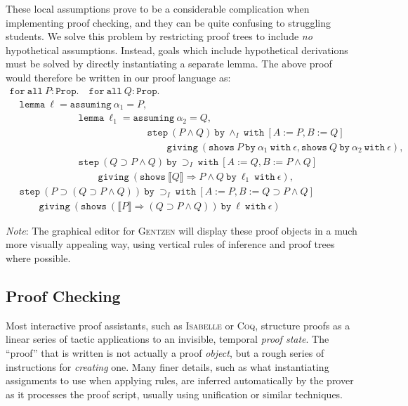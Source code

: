 \documentclass[a4paper]{jfp}
\begin{document}
These local assumptions prove to be a considerable complication when implementing proof checking,
and they can be quite confusing to struggling students. We solve this problem by restricting proof
trees to include \emph{no} hypothetical assumptions. Instead, goals which include hypothetical
derivations must be solved by directly instantiating a separate lemma. The above proof would therefore be written in our
proof language as:
$$
\begin{array}{l}
\mathtt{for\ all}\ P : \mathtt{Prop}.\quad \mathtt{for\ all}\ Q : \mathtt{Prop}.\\
\quad \mathtt{lemma}\ \ell = \mathtt{assuming}\ \alpha_1 = P, \\
\quad \qquad \qquad \qquad \mathtt{lemma}\ \ell_1 = \mathtt{assuming}\ \alpha_2 = Q, \\
\quad \qquad \qquad \qquad \qquad \qquad \qquad \quad \mathtt{step}\ (P \land Q)\ \mathtt{by}\ \land_I\ \mathtt{with}\ [A := P, B := Q ]\ \\ 
\quad \qquad \qquad \qquad \qquad \qquad \qquad \quad \qquad \mathtt{giving}\ (\mathtt{shows}\ P\ \mathtt{by}\ \alpha_1\ \mathtt{with}\ \epsilon, \mathtt{shows}\ Q\ \mathtt{by}\ \alpha_2\ \mathtt{with}\ \epsilon), \\
\quad \qquad \qquad \qquad  \mathtt{step}\ (Q \supset P \land Q)\ \mathtt{by}\ \supset_I\ \mathtt{with}\ [ A := Q, B := P \land Q ]                 \\
\qquad \qquad \qquad \qquad \quad \mathtt{giving}\ (\mathtt{shows}\ \llbracket Q \rrbracket \Rightarrow P \land Q\ \mathtt{by}\ \ell_1\ \mathtt{with}\ \epsilon), \\
\quad  \mathtt{step}\ (P \supset (Q \supset P \land Q))\ \mathtt{by}\ \supset_I\ \mathtt{with}\ [A := P, B := Q \supset P \land Q]\ \\
\quad \qquad \mathtt{giving}\ (\mathtt{shows}\ (\llbracket P \rrbracket \Rightarrow (Q \supset P \land Q))\ \mathtt{by}\ \ell\ \mathtt{with}\ \epsilon)
\end{array}
$$

\emph{Note}: The graphical editor for \textsc{Gentzen} will display these proof objects in a much more
visually appealing way, using vertical rules of inference and proof trees where possible.


\subsection{Proof Checking}

Most interactive proof assistants, such as \textsc{Isabelle} or \textsc{Coq}, structure proofs as a linear series of tactic applications to an invisible, temporal \emph{proof state}. The ``proof'' that is written is not actually a 
proof \emph{object}, but a rough series of instructions for \emph{creating} one. Many finer details,
such as what instantiating assignments to use when applying rules, are inferred automatically by
the prover as it processes the proof script, usually using unification or similar techniques.
\end{document}
